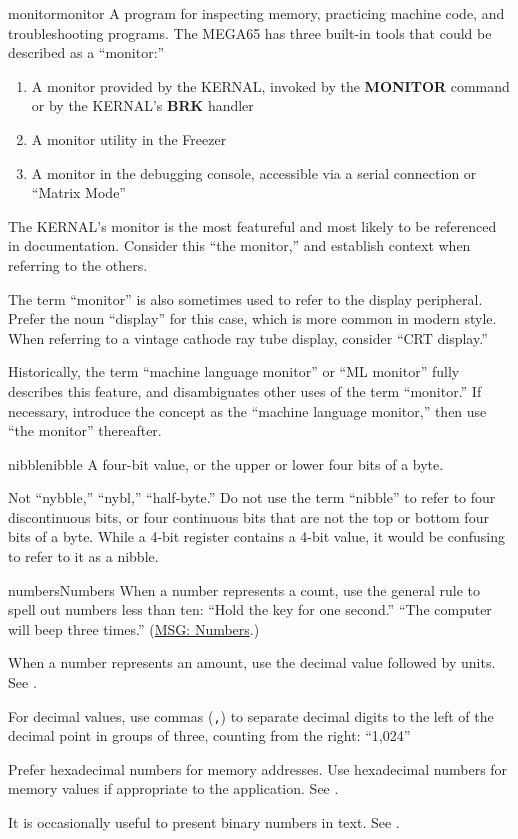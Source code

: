 \begin{sgentry}{monitor}{monitor}
    A program for inspecting memory, practicing machine code, and troubleshooting programs. The MEGA65 has three built-in tools that could be described as a ``monitor:''

    \begin{enumerate}
        \item A monitor provided by the KERNAL, invoked by the \textbf{MONITOR} command or by the KERNAL's \textbf{BRK} handler
        \item A monitor utility in the Freezer
        \item A monitor in the debugging console, accessible via a serial connection or ``Matrix Mode''
    \end{enumerate}

    The KERNAL's monitor is the most featureful and most likely to be referenced in documentation. Consider this ``the monitor,'' and establish context when referring to the others.

    The term ``monitor'' is also sometimes used to refer to the display peripheral. Prefer the noun ``display'' for this case, which is more common in modern style. When referring to a vintage cathode ray tube display, consider ``CRT display.''

    Historically, the term ``machine language monitor'' or ``ML monitor'' fully describes this feature, and disambiguates other uses of the term ``monitor.'' If necessary, introduce the concept as the ``machine language monitor,'' then use ``the monitor'' thereafter.
\end{sgentry}

\begin{sgentry}{nibble}{nibble}
    A four-bit value, or the upper or lower four bits of a byte.

    Not ``nybble,'' ``nybl,'' ``half-byte.'' Do not use the term ``nibble'' to refer to four discontinuous bits, or four continuous bits that are not the top or bottom four bits of a byte. While a 4-bit register contains a 4-bit value, it would be confusing to refer to it as a nibble.
\end{sgentry}

\begin{sgentry}{numbers}{Numbers}
    When a number represents a count, use the general rule to spell out numbers less than ten: ``Hold the key for one second.'' ``The computer will beep three times.'' (\href{https://learn.microsoft.com/en-us/style-guide/numbers}{MSG: Numbers}.)

    When a number represents an amount, use the decimal value followed by units. See .

    For decimal values, use commas (\texttt{,}) to separate decimal digits to the left of the decimal point in groups of three, counting from the right: ``1,024''

    Prefer hexadecimal numbers for memory addresses. Use hexadecimal numbers for memory values if appropriate to the application. See .

    It is occasionally useful to present binary numbers in text. See .
\end{sgentry}

